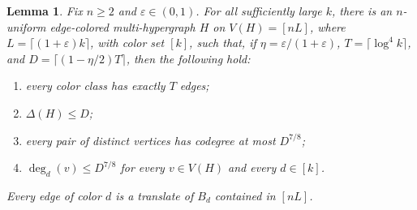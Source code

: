 \documentclass[twoside,12pt]{article}
\numberwithin{equation}{section}
\newtheorem{lemma}[theorem]{Lemma}
\newcommand{\eps}{\varepsilon}
\begin{document}
\begin{lemma}\label{lem:sampling}
Fix $n\ge2$ and $\eps\in(0,1)$.  For all sufficiently large $k$, there is an
$n$-uniform edge-colored multi-hypergraph $H$ on $V(H)=[nL]$, where
$L=\lceil(1+\eps)k\rceil$, with color set $[k]$, such that, if
$\eta=\eps/(1+\eps)$, $T=\lceil\log^4 k\rceil$, and
$D=\lceil(1-\eta/2)T\rceil$, then the following hold:
\begin{enumerate}[label=\textup{(\roman*)},leftmargin=2.4em]
\item every color class has exactly $T$ edges;
\item $\Delta(H)\le D$;
\item every pair of distinct vertices has codegree at most $D^{7/8}$;
\item $\deg_d(v)\le D^{7/8}$ for every $v\in V(H)$ and every $d\in[k]$.
\end{enumerate}
Every edge of color $d$ is a translate of $B_d$ contained in $[nL]$.
\end{lemma}
\end{document}
